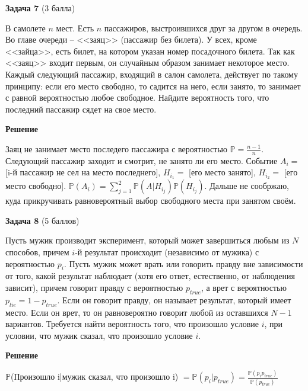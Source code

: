 \documentclass{article}
\newcommand\myp{\mathbb P}
\begin{document}
\textbf{Задача 7} (3 балла)

В самолете $n$ мест.
Есть $n$ пассажиров, выстроившихся друг за другом в очередь.
Во главе очереди -- <<заяц>> (пассажир без билета).
У всех, кроме <<зайца>>, есть билет, на котором указан номер посадочного билета.
Так как <<заяц>> входит первым, он случайным образом занимает некоторое 
место.
Каждый следующий пассажир, входящий в салон самолета, действует по такому 
принципу: если его место свободно, то садится на него, если занято, то занимает с 
равной вероятностью любое свободное.
Найдите вероятность того, что последний пассажир сядет на свое место.

\textbf{Решение}

Заяц не занимает место последего пассажира с вероятностью $\myp = \frac{n-1}{n}$. Следующий пассажир заходит и смотрит, не занято ли его место. Событие $A_i = $ [i-й пассажир не сел на место последнего], $H_i_1 = $ [его место занято], $H_i_2 = $ [его место свободно]. $\myp(A_i) = \sum\limits_{j=1}^{2}\myp(A|H_i_j)\myp(H_i_j)$. Дальше не сообржаю, куда прикручивать равновероятный выбор свободного места при занятом своём.
\newline


\textbf{Задача 8} (5 баллов)

Пусть мужик производит эксперимент, который может завершиться любым из $N$ способов, причем $i$-й результат происходит (независимо от мужика) с вероятностью  $p_i$. Пусть мужик может врать или говорить правду вне зависимости от того, какой результат наблюдает (хотя его ответ, естественно, от наблюдения зависит), причем говорит правду с вероятностью  $p_{true}$, а врет с вероятностью $p_{lie} = 1 - p_{true}$. Если он говорит правду, он называет результат, который имеет место. Если он врет, то он равновероятно говорит любой из оставшихся $N-1$  вариантов. Требуется найти вероятность того, что произошло условие $i$, при условии, что мужик сказал, что произошло условие $i$.

\textbf{Решение}

$\myp$(Произошло i|мужик сказал, что произошло i) $= \myp(p_i|p_{true}) = \frac{\myp(p_i p_{true})}{\myp(p_{true})}$
\end{document}
